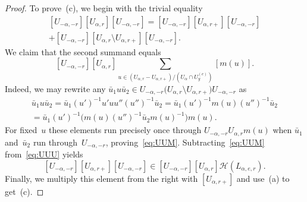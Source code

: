 \documentclass{amsart}
\theoremstyle{remark}
\theoremstyle{definition}
\newcommand*{\Un}{U}%
\newcommand*{\UC}[1]{U_{#1}}%
\newcommand*{\Hecke}{\mathcal H}%
\begin{document}
\begin{proof}
  To prove~(c), we begin with the trivial equality
  \begin{multline}
    \label{eq:UUU}
    [\Un_{-\alpha,-r}] [\Un_{\alpha,r}] [\Un_{-\alpha,-r}]
    = [\Un_{-\alpha,-r}] [\Un_{\alpha, r+}] [\Un_{-\alpha,-r}]
    \\+ [\Un_{-\alpha,-r}] [\Un_{\alpha,r} \setminus \Un_{\alpha, r+}] [\Un_{-\alpha,-r}].
  \end{multline}
  We claim that the second summand equals
  \begin{equation}
    \label{eq:UUM}
    [\Un_{-\alpha,-r}] [\Un_{\alpha,r}] \sum_{u \in (\Un_{\alpha,r} - \Un_{\alpha, r+}) /
      (\Un_\alpha \cap \UC{y}^{(e)}) } [m(u)].
  \end{equation}
  Indeed, we may rewrite any \(\bar u_1 u \bar u_2 \in \Un_{-\alpha,-r} \bigl(\Un_{\alpha,r} \setminus \Un_{\alpha, r+} \bigr) \Un_{-\alpha,-r}\) as
  \begin{multline*}
    \bar u_1 u \bar u_2
    = \bar{u}_1 (u')^{-1} u' u u'' (u'')^{-1} \bar{u}_2
    = \bar{u}_1 (u')^{-1} m(u) (u'')^{-1} \bar{u}_2
    \\= \bar{u}_1 (u')^{-1} \bigl( m(u) (u'')^{-1} \bar{u}_2 m(u)^{-1} \bigr) m(u).
  \end{multline*}
  For fixed~\(u\) these elements run precisely once through \(\Un_{-\alpha,-r} \Un_{\alpha,r} m(u)\) when \(\bar u_1\) and~\(\bar u_2\) run through~\(\Un_{-\alpha,-r}\), proving~\eqref{eq:UUM}.  Subtracting~\eqref{eq:UUM} from~\eqref{eq:UUU} yields
  \begin{equation}
    \label{eq:3.10}
    [\Un_{-\alpha,-r}] [\Un_{\alpha, r+}] [\Un_{-\alpha,-r}]
    \in [\Un_{-\alpha,-r}] [\Un_{\alpha,r}] \Hecke (L_{\alpha,e,r}).
  \end{equation}
  Finally, we multiply this element from the right with \([\Un_{\alpha, r+}]\) and use~(a) to get~(c).


\end{proof}
\end{document}
